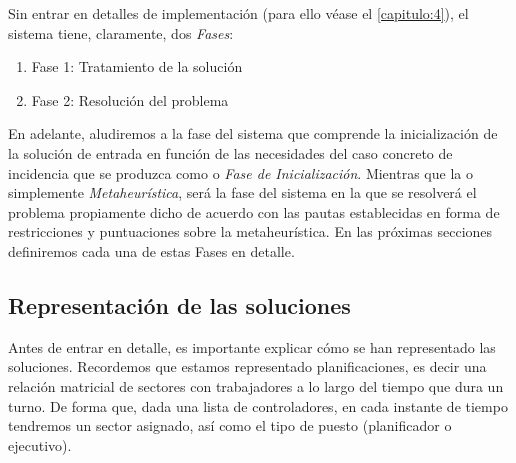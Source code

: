 
Sin entrar en detalles de implementación (para ello véase el \autoref{capitulo:4}), el sistema tiene, claramente, dos 
\textit{Fases}:
\begin{enumerate}[label={}]
	\item \label{Fase 1} Fase 1: Tratamiento de la solución
	\item \label{Fase 2} Fase 2: Resolución del problema
\end{enumerate}

En adelante, aludiremos a la fase del sistema que comprende la inicialización de la solución de entrada en función de las necesidades del caso concreto de incidencia que se produzca como \faseuno{} o \textit{Fase de Inicialización}. 
Mientras que la \fasedos{} o simplemente \textit{Metaheurística}, será la fase del sistema en la que se resolverá el problema propiamente dicho de acuerdo con las pautas establecidas en forma de restricciones y puntuaciones sobre la metaheurística.
En las próximas secciones definiremos cada una de estas Fases en detalle.

\subsection{Representación de las soluciones}
\label{apartado:representacion-soluciones}

Antes de entrar en detalle, es importante explicar cómo se han representado las soluciones. Recordemos que estamos representado planificaciones, es decir una relación matricial de sectores con trabajadores a lo largo del tiempo que dura un turno. De forma que, dada una lista de controladores, en cada instante de tiempo tendremos un sector asignado, así como el tipo de puesto (planificador o ejecutivo).

